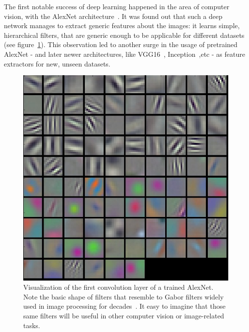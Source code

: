   \par The first notable success of deep learning happened in the area of computer vision, with the AlexNet architecture~\citep{krizhevsky2012imagenet}. It was found out that such a deep network manages to extract generic features about the images: it learns simple, hierarchical filters, that are generic enough to be applicable for different datasets (see figure~\ref{fig:AlexNet_filters}). This observation led to another surge in the usage of pretrained AlexNet - and later newer architectures, like VGG16~\citep{simonyan2014very}, Inception~\citep{szegedy2015going},etc - as feature extractors for new, unseen datasets.

  \begin{figure}[!htbp]
  \centering
  \includegraphics[scale=0.4]{images/sota/filt1.jpeg}
  \caption[Convolution Neural Networks filters shape]{Visualization of the first convolution layer of a trained AlexNet. Note the basic shape of filters that resemble to Gabor filters widely used in image processing for decades~\citep{fogel1989gabor,jain1991unsupervised}. It easy to imagine that those same filters will be useful in other computer vision or image-related tasks.}
  \label{fig:AlexNet_filters}
  \end{figure}

